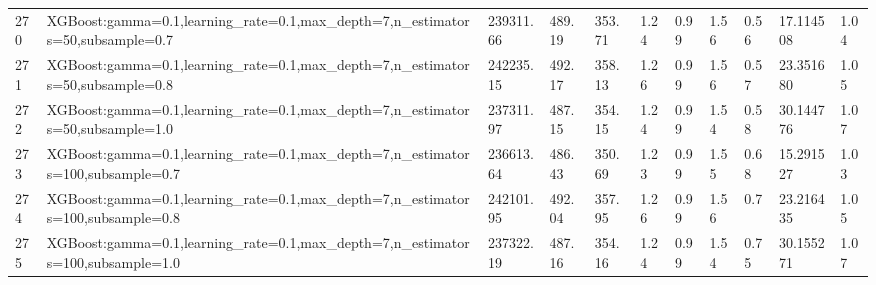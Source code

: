 \begin{longtable}{C{0.8cm} L{2cm} C{1.15cm} C{1.15cm} C{1.15cm} C{1.15cm} C{0.85cm} C{1.25cm} C{1.2cm} C{1.5cm} C{1.0cm}}
270 & XGBoost:\newline gamma=0.1,\newline learning\_rate=0.1,\newline max\_depth=7,\newline n\_estimators=50,\newline subsample=0.7 & 239311.66 & 489.19 & 353.71 & 1.24 & 0.99 & 1.56 & 0.56 & 17.114508 & 1.04 \\
271 & XGBoost:\newline gamma=0.1,\newline learning\_rate=0.1,\newline max\_depth=7,\newline n\_estimators=50,\newline subsample=0.8 & 242235.15 & 492.17 & 358.13 & 1.26 & 0.99 & 1.56 & 0.57 & 23.351680 & 1.05 \\
272 & XGBoost:\newline gamma=0.1,\newline learning\_rate=0.1,\newline max\_depth=7,\newline n\_estimators=50,\newline subsample=1.0 & 237311.97 & 487.15 & 354.15 & 1.24 & 0.99 & 1.54 & 0.58 & 30.144776 & 1.07 \\
273 & XGBoost:\newline gamma=0.1,\newline learning\_rate=0.1,\newline max\_depth=7,\newline n\_estimators=100,\newline subsample=0.7 & 236613.64 & 486.43 & 350.69 & 1.23 & 0.99 & 1.55 & 0.68 & 15.291527 & 1.03 \\
274 & XGBoost:\newline gamma=0.1,\newline learning\_rate=0.1,\newline max\_depth=7,\newline n\_estimators=100,\newline subsample=0.8 & 242101.95 & 492.04 & 357.95 & 1.26 & 0.99 & 1.56 & 0.7 & 23.216435 & 1.05 \\
275 & XGBoost:\newline gamma=0.1,\newline learning\_rate=0.1,\newline max\_depth=7,\newline n\_estimators=100,\newline subsample=1.0 & 237322.19 & 487.16 & 354.16 & 1.24 & 0.99 & 1.54 & 0.75 & 30.155271 & 1.07 \\

\end{longtable}
